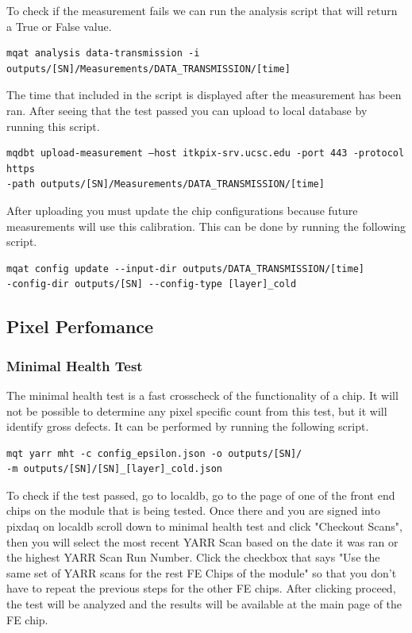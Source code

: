 \documentclass[12pt]{article}
\begin{document}
To check if the measurement fails we can run the analysis script that will return a True or False value. 
\begin{verbatim}
mqat analysis data-transmission -i outputs/[SN]/Measurements/DATA_TRANSMISSION/[time]
\end{verbatim}

The time that included in the script is displayed after the measurement has been ran. After seeing that the test passed you can upload to local database by running this script. 

\begin{verbatim}
mqdbt upload-measurement –host itkpix-srv.ucsc.edu -port 443 -protocol https
-path outputs/[SN]/Measurements/DATA_TRANSMISSION/[time]
\end{verbatim}
After uploading you must update the chip configurations because future measurements will use this calibration. This can be done by running the following script. 
\begin{verbatim}
mqat config update --input-dir outputs/DATA_TRANSMISSION/[time] 
-config-dir outputs/[SN] --config-type [layer]_cold
\end{verbatim}

\subsection{Pixel Perfomance}



\subsubsection{Minimal Health Test}

The minimal health test is a fast crosscheck of the functionality of a chip. It will not be possible to determine any pixel specific count from this test, but it will identify gross defects. It can be performed by running the following script. 

\begin{verbatim}
mqt yarr mht -c config_epsilon.json -o outputs/[SN]/
-m outputs/[SN]/[SN]_[layer]_cold.json 
\end{verbatim}

To check if the test passed, go to localdb, go to the page of one of the front end chips on the module that is being tested. Once there and you are signed into pixdaq on localdb scroll down to minimal health test and click "Checkout Scans", then you will select the most recent YARR Scan based on the date it was ran or the highest YARR Scan Run Number. Click the checkbox that says "Use the same set of YARR scans for the rest FE Chips of the module" so that you don't have to repeat the previous steps for the other FE chips. After clicking proceed, the test will be analyzed and the results will be available at the main page of the FE chip. 
\end{document}
